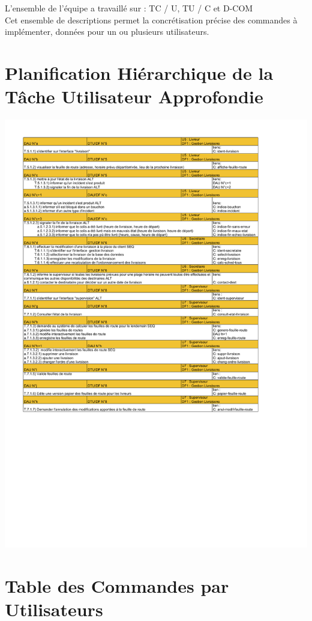 \documentclass{report}
\begin{document}
L'ensemble de l'équipe a travaillé sur : TC / U, TU / C et D-COM\\

Cet ensemble de descriptions permet la concrétisation précise des commandes à implémenter, données pour un ou plusieurs utilisateurs.

\newpage

\section{Planification Hiérarchique de la Tâche Utilisateur Approfondie}

\includegraphics[scale = 0.85]{images/DAU.pdf}

\section{Table des Commandes par Utilisateurs}
\end{document}
